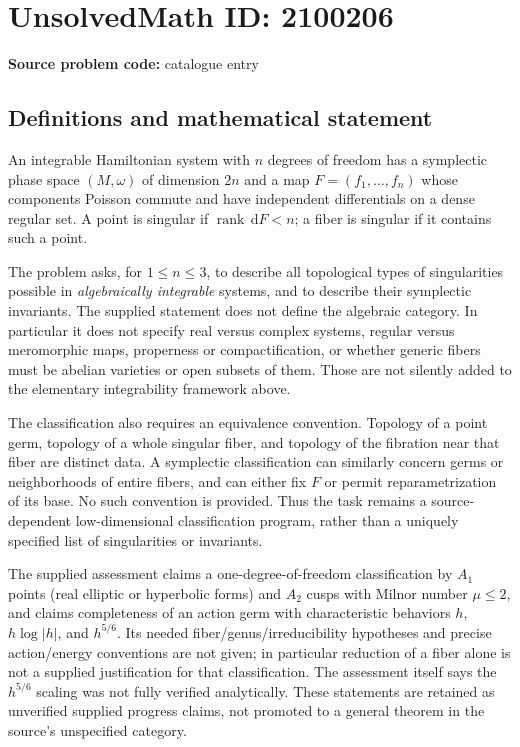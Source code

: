 \documentclass[11pt]{article}
\newcommand{\dd}{\,\mathrm{d}}
\begin{document}
\section*{UnsolvedMath ID: 2100206}
\textbf{Source problem code:} catalogue entry
\subsection{Definitions and mathematical statement}
An integrable Hamiltonian system with $n$ degrees of freedom has a symplectic phase space $(M,\omega)$ of dimension $2n$ and a map $F=(f_1,\ldots,f_n)$ whose components Poisson commute and have independent differentials on a dense regular set. A point is singular if $\operatorname{rank}\dd F<n$; a fiber is singular if it contains such a point.

The problem asks, for $1\leq n\leq3$, to describe all topological types of singularities possible in \emph{algebraically integrable} systems, and to describe their symplectic invariants. The supplied statement does not define the algebraic category. In particular it does not specify real versus complex systems, regular versus meromorphic maps, properness or compactification, or whether generic fibers must be abelian varieties or open subsets of them. Those are not silently added to the elementary integrability framework above.

The classification also requires an equivalence convention. Topology of a point germ, topology of a whole singular fiber, and topology of the fibration near that fiber are distinct data. A symplectic classification can similarly concern germs or neighborhoods of entire fibers, and can either fix $F$ or permit reparametrization of its base. No such convention is provided. Thus the task remains a source-dependent low-dimensional classification program, rather than a uniquely specified list of singularities or invariants.

The supplied assessment claims a one-degree-of-freedom classification by $A_1$ points (real elliptic or hyperbolic forms) and $A_2$ cusps with Milnor number $\mu\leq2$, and claims completeness of an action germ with characteristic behaviors $h$, $h\log|h|$, and $h^{5/6}$. Its needed fiber/genus/irreducibility hypotheses and precise action/energy conventions are not given; in particular reduction of a fiber alone is not a supplied justification for that classification. The assessment itself says the $h^{5/6}$ scaling was not fully verified analytically. These statements are retained as unverified supplied progress claims, not promoted to a general theorem in the source's unspecified category.
\end{document}
